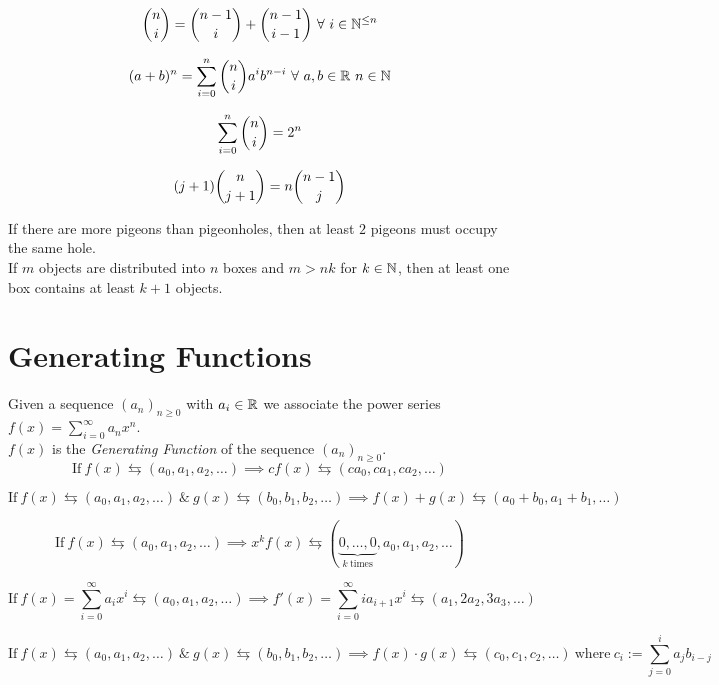 \documentclass[11pt,a4paper]{article}
\begin{document}
$$\binomial{n}{i}=\binomial{n-1}{i}+\binomial{n-1}{i-1}\ \forall\ i\in\nats^{\leq n}$$

$$(a+b)^n=\sum_{i=0}^n\binomial{n}{i}a^ib^{n-i}\ \forall\ a,b\in\reals\ n\in\nats$$

$$\sum_{i=0}^n\displaystyle{{{n}\choose{i}}}=2^n$$

$$(j+1)\displaystyle{{{n}\choose{j+1}}}=n\displaystyle{{{n-1}\choose{j}}}$$

If there are more pigeons than pigeonholes, then at least $2$ pigeons must occupy the same hole.\\

If $m$ objects are distributed into $n$ boxes and $m>nk$ for $k\in\mathbb{N}$, then at least one box contains at least $k+1$ objects.

\section{Generating Functions}

Given a sequence $(a_n)_{n\geq0}$ with $a_i\in\mathbb{R}$ we associate the power series $f(x)=\sum_{i=0}^\infty a_nx^n$.\\
$f(x)$ is the \textit{Generating Function} of the sequence $(a_n)_{n\geq0}$.\\

$$\mathrm{If}\ f(x)\leftrightarrows(a_0,a_1,a_2,\dots)\implies cf(x)\leftrightarrows(ca_0,ca_1,ca_2,\dots)$$

$$\mathrm{If}\ f(x)\leftrightarrows(a_0,a_1,a_2,\dots)\ \&\ g(x)\leftrightarrows(b_0,b_1,b_2,\dots)\implies f(x)+g(x)\leftrightarrows (a_0+b_0,a_1+b_1,\dots)$$

$$\mathrm{If}\ f(x)\leftrightarrows(a_0,a_1,a_2,\dots)\implies x^kf(x)\leftrightarrows(\underbrace{0,\dots,0}_{k\ \mathrm{times}},a_0,a_1,a_2,\dots)$$

$$\mathrm{If}\ f(x)=\sum_{i=0}^\infty a_ix^i\leftrightarrows(a_0,a_1,a_2,\dots)\implies f'(x)=\sum_{i=0}^\infty ia_{i+1}x^i\leftrightarrows(a_1,2a_2,3a_3,\dots)$$

$$\mathrm{If}\ f(x)\leftrightarrows(a_0,a_1,a_2,\dots)\ \& \ g(x)\leftrightarrows(b_0,b_1,b_2,\dots)\implies f(x)\cdot g(x)\leftrightarrows(c_0,c_1,c_2,\dots)\ \mathrm{where}\ c_i:=\sum_{j=0}^ia_jb_{i-j}$$
\end{document}
